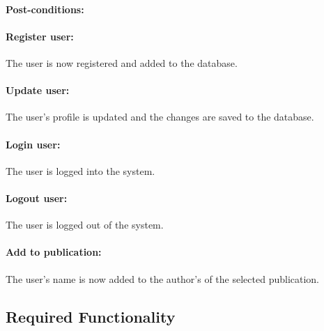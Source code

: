\documentclass{article}
\begin{document}
	\paragraph{Post-conditions:}
	\paragraph{Register user:} The user is now registered and added to the database.
	\paragraph{Update user:} The user's profile is updated and the changes are saved to the database.
	\paragraph{Login user:} The user is logged into the system.
	\paragraph{Logout user:} The user is logged out of the system.
	\paragraph{Add to publication:} The user's name is now added to the author's of the selected publication.
	\subsection{Required Functionality}
\end{document}
